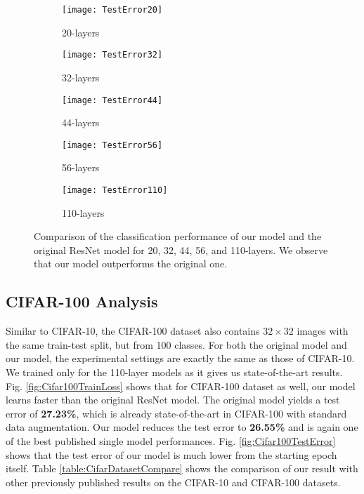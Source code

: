 \documentclass[10pt,twocolumn,letterpaper]{article}
\begin{document}
\begin{figure*}
    \centering
    \begin{subfigure}{.33\linewidth}
        \centering
        \texttt{[image: TestError20]}
        \caption{20-layers}
        \label{fig:Cifar10TestError20}
    \end{subfigure}
    \begin{subfigure}{.33\linewidth}
        \centering
        \texttt{[image: TestError32]}
        \caption{32-layers}
        \label{fig:Cifar10TestError32}
    \end{subfigure}
    \begin{subfigure}{.33\linewidth}
        \centering
        \texttt{[image: TestError44]}
        \caption{44-layers}
        \label{fig:Cifar10TestError44}
    \end{subfigure}
    \begin{subfigure}{.4\textwidth}
        \centering
        \texttt{[image: TestError56]}
        \caption{56-layers}
        \label{fig:Cifar10TestError56}
    \end{subfigure}
    \begin{subfigure}{.4\textwidth}
        \centering
        \texttt{[image: TestError110]}
        \caption{110-layers}
        \label{fig:Cifar10TestError110}
    \end{subfigure}
    \caption{Comparison of the classification performance of our model and the original ResNet model for 20, 32, 44, 56, and 110-layers. We observe that our model outperforms the original one.}
    \label{fig:Cifar10TestError}
\end{figure*}


\subsection{CIFAR-100 Analysis}

Similar to CIFAR-10, the CIFAR-100 dataset \cite{[10]} also contains $32 \times 32$ images with the same train-test split, but from 100 classes. For both the original model and our model, the experimental settings are exactly the same as those of CIFAR-10. We trained only for the 110-layer models as it gives us state-of-the-art results. Fig. \ref{fig:Cifar100TrainLoss} shows that for CIFAR-100 dataset as well, our model learns faster than the original ResNet model. The original model yields a test error of \textbf{27.23\%}, which is already state-of-the-art in CIFAR-100 with standard data augmentation. Our model reduces the test error to \textbf{26.55\%} and is again one of the best published single model performances. Fig. \ref{fig:Cifar100TestError} shows that the test error of our model is much lower from the starting epoch itself. Table \ref{table:CifarDatasetCompare} shows the comparison of our result with other previously published results on the CIFAR-10 and CIFAR-100 datasets.
\end{document}
